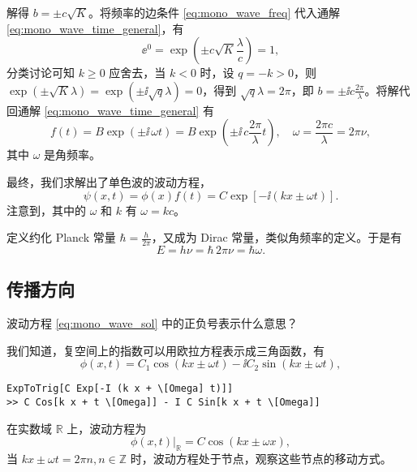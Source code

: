解得 $b = \pm c\sqrt{K}$。将频率的边条件 \eqref{eq:mono_wave_freq} 代入通解 \eqref{eq:mono_wave_time_general}，有
\begin{equation}
    \ee^0 = \exp \left(\pm c \sqrt K \frac\lambda{c}\right) = 1,
\end{equation}
分类讨论可知 $ k \geq 0$ 应舍去，当 $k<0$ 时，设 $q = -k>0$，则 $\exp(\pm \sqrt K \lambda) = \exp(\pm \ii\sqrt q \lambda) = 0$，得到 $\sqrt q \lambda = 2\pi$，即 $b = \pm \ii c \frac{2\pi}\lambda$。将解代回通解 \eqref{eq:mono_wave_time_general} 有
\begin{equation}
    f(t) = B \exp\left(\pm\ii \,\omega t\right) = B \exp \left(\pm \ii \,c \frac{2\pi}\lambda t\right),\quad \omega = \frac{2\pi c}{\lambda} = 2\pi \nu,
\end{equation}
其中 $\omega$ 是角频率。

最终，我们求解出了单色波的波动方程，
\begin{equation}
    \psi(x,t) = \phi(x) f(t) = C \exp[-\ii(k x \pm \omega t)]. \label{eq:mono_wave_sol}
\end{equation}
注意到，其中的 $\omega$ 和 $k$ 有 $\omega = k c$。

定义约化 Planck 常量 $\hbar = \frac{h}{2\pi}$，又成为 Dirac 常量，类似角频率的定义。于是有
\begin{equation}
    E = h\nu = \hbar \, 2\pi \nu = \hbar \omega. 
\end{equation}
\subsection{传播方向}
波动方程 \eqref{eq:mono_wave_sol} 中的正负号表示什么意思？

我们知道，复空间上的指数可以用欧拉方程表示成三角函数，有
\begin{equation}
    \phi(x,t) = C_1 \cos (k x\pm \omega t)-\ii C_2 \sin (k x \pm \omega t),
\end{equation}
\begin{lstlisting}
ExpToTrig[C Exp[-I (k x + \[Omega] t)]]
>> C Cos[k x + t \[Omega]] - I C Sin[k x + t \[Omega]]
\end{lstlisting}
在实数域 $\mathbb{R}$ 上，波动方程为
\begin{equation}
    \phi(x,t)|_\mathbb{R} = C \cos(k x\pm \omega x),
\end{equation}
当 $kx\pm\omega t=2\pi n, n \in \mathbb{Z}$ 时，波动方程处于节点，观察这些节点的移动方式。

